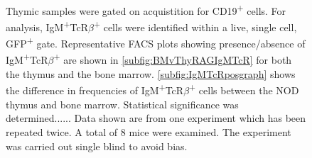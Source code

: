 \begin{figure}
{Thymic samples were gated on acquistition for CD19\textsuperscript{+} cells.
For analysis, IgM\textsuperscript{+}TcR$\beta$\textsuperscript{+} cells were identified within a live, single cell, GFP\textsuperscript{+} gate.
Representative FACS plots showing presence/absence of IgM\textsuperscript{+}TcR$\beta$\textsuperscript{+} are shown in \ref{subfig:BMvThyRAGIgMTcR} for both the thymus and the bone marrow.
\ref{subfig:IgMTcRposgraph} shows the difference in frequencies of IgM\textsuperscript{+}TcR$\beta$\textsuperscript{+} cells between the NOD thymus and bone marrow. Statistical significance was determined......
Data shown are from one experiment which has been repeated twice. A total of 8 mice were examined.
The experiment was carried out single blind to avoid bias.}
\label{fig:RAGIgMTcRpos}
\end{figure}





